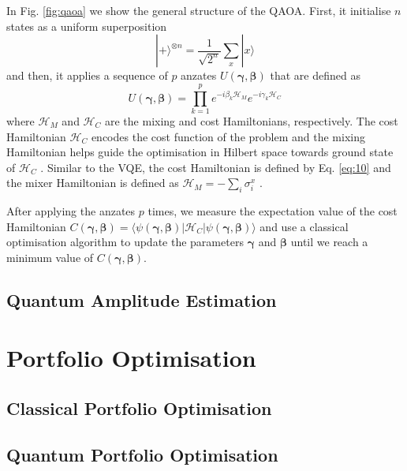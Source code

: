 \documentclass[prx,twocolumn,floatfix,superscriptaddress,longbibliography]{revtex4-1}
\begin{document}
In Fig. \ref{fig:qaoa} we show the general structure of the QAOA. First, it initialise $n$ states as a uniform superposition
\begin{equation}
  \label{eq:15}
  |+\rangle^{\otimes n} = \frac{1}{\sqrt{2^n}} \sum_{x} |x\rangle 
\end{equation}
and then, it applies a sequence of $p$ anzates $U(\boldsymbol{\gamma}, \boldsymbol{\beta})$  that are defined as 
\begin{equation}
  \label{eq:16}
  U(\boldsymbol{\gamma}, \boldsymbol{\beta}) = \prod_{k=1}^{p} e^{-i\beta_k \mathcal{H}_M} e^{-i\gamma_k \mathcal{H}_C}
\end{equation}
where $\mathcal{H}_M$ and $\mathcal{H}_C$ are the mixing and cost Hamiltonians, respectively. The cost Hamiltonian $\mathcal{H}_C$ encodes the cost function of the problem and the mixing Hamiltonian helps guide the optimisation in Hilbert space towards ground state of $\mathcal{H}_C$ \cite{Moll2018}. Similar to the VQE, the cost Hamiltonian is defined by Eq. \ref{eq:10} and the mixer Hamiltonian 
is defined as $\mathcal{H}_M = -\sum_{i} \sigma_i^x$ \cite{Moll2018}.

After applying the anzates $p$ times, we measure the expectation value of the cost Hamiltonian $C(\boldsymbol{\gamma},\boldsymbol{\beta}) = \langle \psi(\boldsymbol{\gamma}, \boldsymbol{\beta})|\mathcal{H}_C|\psi(\boldsymbol{\gamma},\boldsymbol{\beta})\rangle$ and use a classical optimisation algorithm to update the parameters $\boldsymbol{\gamma}$ and $\boldsymbol{\beta}$ until we reach a minimum value of $C(\boldsymbol{\gamma},\boldsymbol{\beta})$.

\subsection{Quantum Amplitude Estimation}


\section{Portfolio Optimisation}\label{sec:literature1}



\subsection{Classical Portfolio Optimisation}

\subsection{Quantum Portfolio Optimisation}
\end{document}
